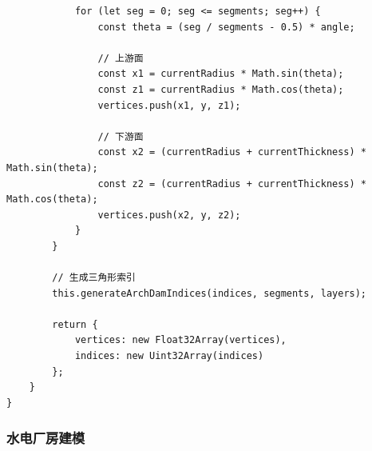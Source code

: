 \begin{lstlisting}
            for (let seg = 0; seg <= segments; seg++) {
                const theta = (seg / segments - 0.5) * angle;
                
                // 上游面
                const x1 = currentRadius * Math.sin(theta);
                const z1 = currentRadius * Math.cos(theta);
                vertices.push(x1, y, z1);
                
                // 下游面
                const x2 = (currentRadius + currentThickness) * Math.sin(theta);
                const z2 = (currentRadius + currentThickness) * Math.cos(theta);
                vertices.push(x2, y, z2);
            }
        }
        
        // 生成三角形索引
        this.generateArchDamIndices(indices, segments, layers);
        
        return {
            vertices: new Float32Array(vertices),
            indices: new Uint32Array(indices)
        };
    }
}
\end{lstlisting}

\subsubsection{水电厂房建模}\label{ux6c34ux7535ux5382ux623fux5efaux6a21}

